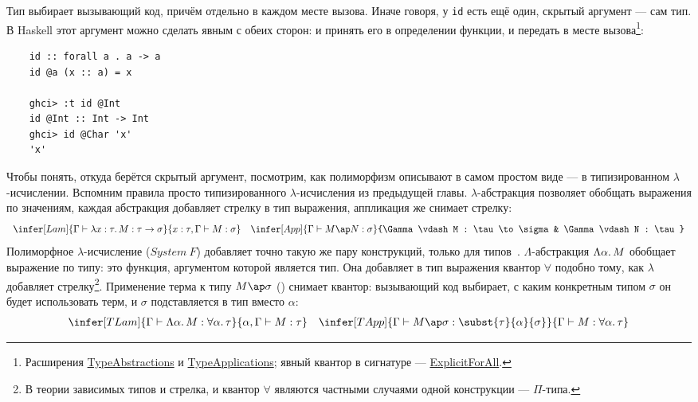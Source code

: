 Тип выбирает вызывающий код, причём отдельно в каждом месте вызова.
Иначе говоря, у \texttt{id} есть ещё один, скрытый аргумент --- сам тип.
В Haskell этот аргумент можно сделать явным с обеих сторон: и принять его в определении функции, и передать в месте вызова\footnote{Расширения \href{https://downloads.haskell.org/ghc/latest/docs/users_guide/exts/type_abstractions.html}{TypeAbstractions} и \href{https://downloads.haskell.org/ghc/latest/docs/users_guide/exts/type_applications.html}{TypeApplications}; явный квантор в сигнатуре --- \href{https://downloads.haskell.org/ghc/latest/docs/users_guide/exts/explicit_forall.html\#extension-ExplicitForAll}{ExplicitForAll}.}:
\begin{verbatim}
    id :: forall a . a -> a
    id @a (x :: a) = x

    ghci> :t id @Int
    id @Int :: Int -> Int
    ghci> id @Char 'x'
    'x'
\end{verbatim}

Чтобы понять, откуда берётся скрытый аргумент, посмотрим, как полиморфизм описывают в самом простом виде --- в типизированном $\lambda$-исчислении.
Вспомним правила просто типизированного $\lambda$-исчисления из предыдущей главы.
$\lambda$-абстракция позволяет обобщать выражения по значениям, каждая абстракция добавляет стрелку в тип выражения, аппликация же снимает стрелку:
\[
    \begin{array}{cc}
        \infer[Lam]{\Gamma\vdash \lambda x : \tau\ldotp M : \tau\to\sigma}{x : \tau, \Gamma\vdash M : \sigma}
        &
        \infer[App]{\Gamma\vdash M\ap N : \sigma}{\Gamma\vdash M : \tau\to\sigma & \Gamma\vdash N : \tau}
    \end{array}
\]
Полиморфное $\lambda$-исчисление ($System~F$) добавляет точно такую же пару конструкций, только для типов~\cite[глава 23]{pierce2002types}.
$\Lambda$-абстракция $\Lambda\alpha\ldotp M$ обобщает выражение по типу: это функция, аргументом которой является тип.
Она добавляет в тип выражения квантор $\forall$ подобно тому, как $\lambda$ добавляет стрелку\footnote{В теории зависимых типов и стрелка, и квантор $\forall$ являются частными случаями одной конструкции --- $\Pi$-типа.}.
Применение терма к типу $M\ap\sigma$ () снимает квантор: вызывающий код выбирает, с каким конкретным типом $\sigma$ он будет использовать терм, и $\sigma$ подставляется в тип вместо $\alpha$:
\[
    \begin{array}{cc}
        \infer[TLam]{\Gamma\vdash\Lambda\alpha\ldotp M : \forall\alpha\ldotp\tau}{\alpha, \Gamma\vdash M : \tau}
        &
        \infer[TApp]{\Gamma\vdash M\ap\sigma : \subst{\tau}{\alpha}{\sigma}}{\Gamma\vdash M : \forall\alpha\ldotp\tau}
    \end{array}
\]


